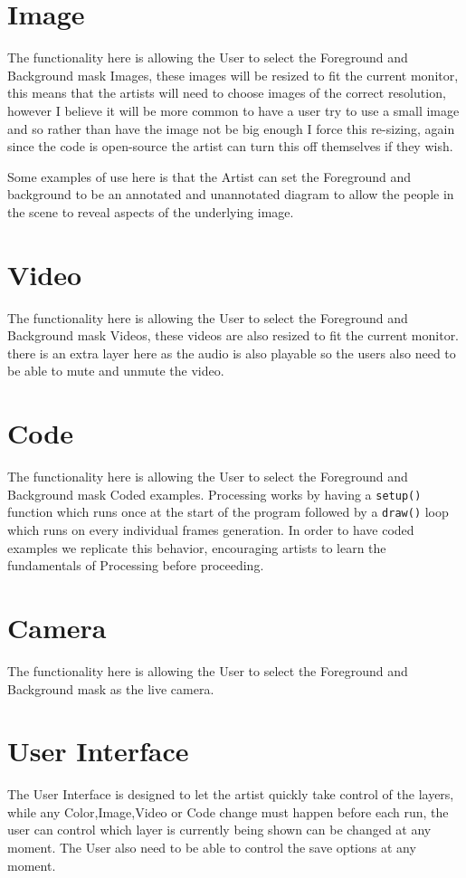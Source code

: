 \documentclass[a4paper]{report}
\begin{document}
\section{Image}
The functionality here is allowing the User to select the Foreground and Background mask Images, these images will be resized to fit the current monitor, this means that the artists will need to choose images of the correct resolution, however I believe it will be more common to have a user try to use a small image and so rather than have the image not be big enough I force this re-sizing, again since the code is open-source the artist can turn this off themselves if they wish.

Some examples of use here is that the Artist can set the Foreground and background to be an annotated and unannotated diagram to allow the people in the scene to reveal aspects of the underlying image.

\section{Video}
The functionality here is allowing the User to select the Foreground and Background mask Videos, these videos are also resized to fit the current monitor. there is an extra layer here as the audio is also playable so the users also need to be able to mute and unmute the video.

\section{Code}
The functionality here is allowing the User to select the Foreground and Background mask Coded examples. Processing \cite{PROCESSING} works by having a 
\verb|setup()| function which runs once at the start of the program followed by a \verb|draw()| loop which runs on every individual frames generation. In order to have coded examples we replicate this behavior, encouraging artists to learn the fundamentals of Processing before proceeding.

\section{Camera}
The functionality here is allowing the User to select the Foreground and Background mask as the live camera.

\section{User Interface}
The User Interface is designed to let the artist quickly take control of the layers, while any Color,Image,Video or Code change must happen before each run, the user can control which layer is currently being shown can be changed at any moment. The User also need to be able to control the save options at any moment.
\end{document}
